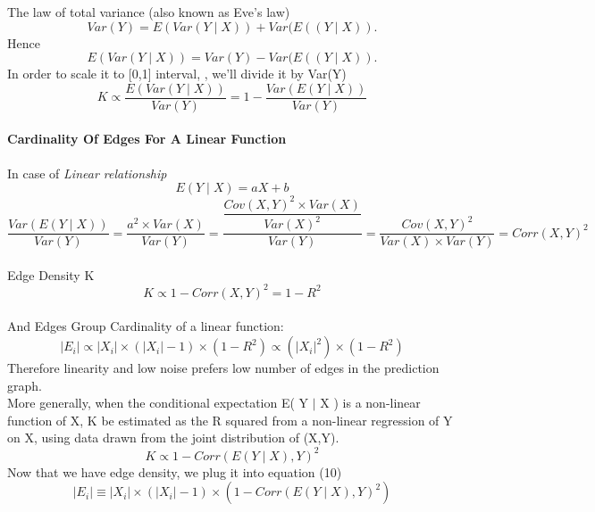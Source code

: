 \documentclass[a4paper]{article}
\begin{document}
The law of total variance (also known as Eve's law)
\begin{equation}
Var(Y)=E(Var(Y\mid X)) +Var(E((Y\mid X)).
\end{equation}
Hence
\begin{equation}
E(Var(Y\mid X)) = Var(Y)-Var(E((Y\mid X)).
\end{equation}
In order to scale it to [0,1] interval, , we'll divide it by Var(Y) 
\begin{equation}
K  \propto \dfrac{E(Var(Y\mid X))}{Var(Y)} = 1 - \dfrac{Var(E(Y\mid X))}{Var(Y)}
\end{equation}
\paragraph{ Cardinality Of Edges  For A Linear Function} 
In case of \emph{Linear relationship} 
\begin{equation}
 E(Y \mid X) =aX+b
\end{equation}
\begin{equation}
\dfrac{ Var(E(Y \mid X))}{Var(Y)} =\dfrac{a^2\times Var(X)}{Var(Y)} =\dfrac{\dfrac{Cov(X,Y)^2\times Var(X)}{Var(X)^2}}{Var(Y)}=\dfrac{Cov(X,Y)^2}{Var(X)\times Var(Y)}=Corr(X,Y)^2
\end{equation}\\
Edge Density K
\begin{equation}
K \propto 1 -Corr(X,Y)^2=1-R^2
\end{equation}\\
And Edges Group Cardinality of a linear function:
\begin{equation}
\mid E_i \mid  \propto |X_i|\times (|X_i|-1) \times (1 -R^2)\propto  (|X_i|^2)\times (1 -R^2)
\end{equation}
Therefore linearity and low noise prefers low number of edges in the prediction graph.\\
More generally, when the conditional expectation E( Y $\mid$ X ) is a non-linear function of X,  K  be estimated as the R squared from a non-linear regression of Y on X, using data drawn from the joint distribution of (X,Y).
\begin{equation}
K \propto 1 - Corr(E(Y\mid X),Y)^2
\end{equation}
Now that we have edge density, we plug it into equation (10)
\begin{equation}
\mid E_i \mid  \equiv |X_i|\times (|X_i|-1) \times (1 - Corr(E(Y\mid X),Y)^2)
\end{equation}

\pagebreak
\end{document}

